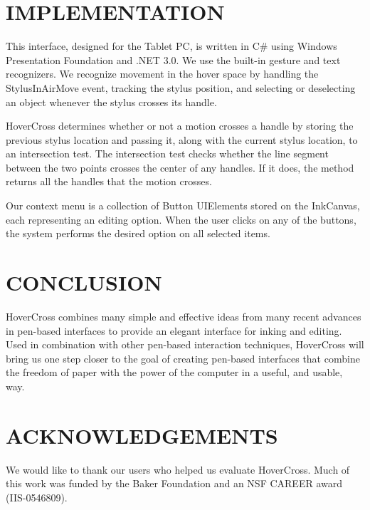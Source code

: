 \documentclass{article}
\begin{document}
\section{IMPLEMENTATION}

This interface, designed for the Tablet PC, is written in C\# using
Windows Presentation Foundation and .NET 3.0.  We use the built-in
gesture and text recognizers.  We recognize movement in the hover
space by handling the StylusInAirMove event, tracking the stylus
position, and selecting or deselecting an object whenever the stylus
crosses its handle.

HoverCross determines whether or not a motion crosses a handle by storing the previous stylus location and passing it, along with the current stylus location, to an intersection test.  The intersection test checks whether the line segment between the two points crosses the center of any handles.  If it does, the method returns all the handles that the motion crosses.

Our context menu is a
collection of Button UIElements stored on the InkCanvas, each
representing an editing option.  When the user clicks on any of the
buttons, the system performs the desired option on all selected items.

\section{CONCLUSION}
HoverCross combines many simple and effective ideas from many
recent advances in pen-based interfaces to provide an elegant
interface for inking and editing.  Used in combination with other
pen-based interaction techniques, HoverCross will bring us one step
closer to the goal of creating pen-based interfaces that combine the
freedom of paper with the power of the computer in a useful, and
usable, way.  


\section{ACKNOWLEDGEMENTS}
We would like to thank our users who helped us evaluate HoverCross.  Much of this work was funded by the Baker Foundation and an NSF CAREER award
(IIS-0546809).


\end{document}
